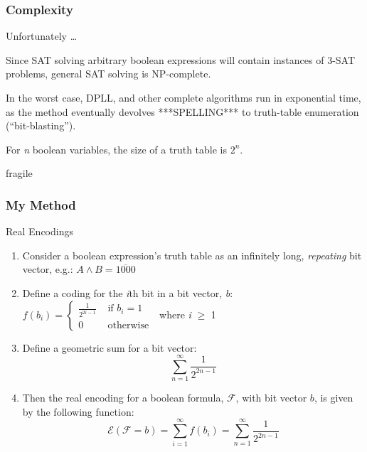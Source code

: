 \documentclass{beamer}
\begin{document}
\begin{frame}
\frametitle{Complexity}
\begin{block}
{Unfortunately \ldots} 

Since SAT solving arbitrary boolean expressions will contain instances of 3-SAT problems, general SAT solving is NP-complete.

In the worst case, DPLL, and other complete algorithms run in exponential time, as the method eventually devolves ***SPELLING*** to truth-table enumeration (``bit-blasting'').

For \emph n boolean variables, the size of a truth table is \(2^n\).

\end{block}
\end{frame}

\begin{frame}{fragile}
\frametitle{My Method}
\begin{block}
{Real Encodings}


\begin{enumerate}
\item {\tiny Consider a boolean expression's truth table as an infinitely long, \emph{repeating} bit vector, e.g.: \(A \land B = \overline{1000}\) }
\item {\tiny Define a coding for the \emph{i}th bit in a bit vector, \emph{b}: \( f(b_i) = \begin{cases} \frac{1}{2^{2i-1}} & \text{ if } b_i = 1\\ 0  & \text{ otherwise } \end{cases}\) where \emph{i} \(\geq\) 1 }
\item {\tiny Define a geometric sum for a bit vector: }
  \[
  \sum_{n=1}^\infty \frac{1}{2^{2n-1}}
  \]
\item {\tiny Then the real encoding for a boolean formula, \(\mathcal{F}\), with bit vector \(b\), is given by the following function:}
  \[
  \mathcal{E}(\mathcal{F} = b) = \sum_{i=1}^\infty f(b_i) =  \sum_{n=1}^\infty \frac{1}{2^{2n-1}}
  \]
\end{enumerate}

\end{block}
\end{frame}
\end{document}
